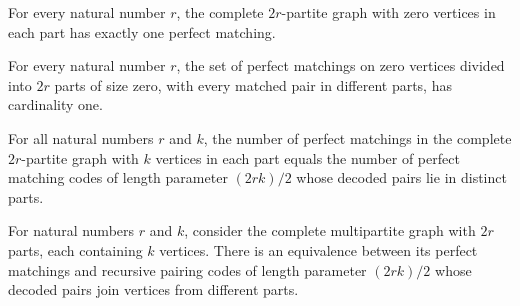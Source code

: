 \begin{theorem}
\label{FABL.card_graphPartitePerfectMatching_zero}
\leanok
{}
For every natural number $r$, the complete $2r$-partite graph with zero vertices in each
part has exactly one perfect matching.
\end{theorem}

\begin{theorem}
\label{FABL.card_partitePerfectMatching_zero}
\leanok
{}
For every natural number $r$, the set of perfect matchings on zero vertices divided into
$2r$ parts of size zero, with every matched pair in different parts, has cardinality
one.
\end{theorem}

\begin{theorem}
\label{FABL.card_graphPartitePerfectMatching_eq_partitePerfectMatching}
\leanok
{}
For all natural numbers $r$ and $k$, the number of perfect matchings in the complete
$2r$-partite graph with $k$ vertices in each part equals the number of perfect matching
codes of length parameter $(2rk)/2$ whose decoded pairs lie in distinct parts.
\end{theorem}

\begin{definition}
\label{FABL.graphPartitePerfectMatchingEquivCode}
\leanok
{}
For natural numbers $r$ and $k$, consider the complete multipartite graph with $2r$
parts, each containing $k$ vertices. There is an equivalence between its perfect
matchings and recursive pairing codes of length parameter $(2rk)/2$ whose decoded pairs
join vertices from different parts.
\end{definition}

